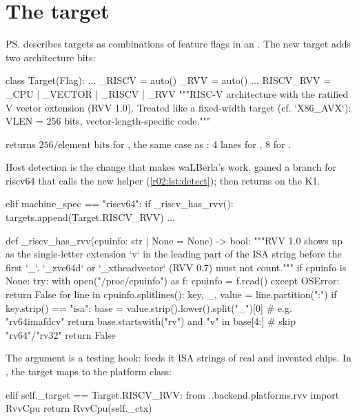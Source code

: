 \section{The target}\label{r02:sec:ps-target}

\ps{} describes targets as combinations of feature flags in an . The new
target adds two architecture bits:
\begin{pycode}
class Target(Flag):
    ...
    _RISCV = auto()
    _RVV = auto()
    ...
    RISCV_RVV = _CPU | _VECTOR | _RISCV | _RVV
    """RISC-V architecture with the ratified V vector extension (RVV 1.0). Treated like a
    fixed-width target (cf. `X86_AVX`): VLEN = 256 bits, vector-length-specific code."""
\end{pycode}
 returns $256/\text{element bits}$ for ,
the same case as : 4 lanes for , 8 for .

Host detection is the change that makes waLBerla's  work.
 gained a branch for riscv64 that calls the new helper
 (\cref{r02:lst:detect});  then returns
 on the K1.

\begin{pycode}[nolol=false,caption={[RVV host detection in pystencils]RVV host detection in \texttt{codegen/target.py} (abridged).},label=r02:lst:detect]
    elif machine_spec == "riscv64":
        if _riscv_has_rvv():
            targets.append(Target.RISCV_RVV)
    ...

def _riscv_has_rvv(cpuinfo: str | None = None) -> bool:
    """RVV 1.0 shows up as the single-letter extension `v` in the leading part of the
    ISA string before the first `_`. `_zve64d` or `_xtheadvector` (RVV 0.7) must not count."""
    if cpuinfo is None:
        try:
            with open("/proc/cpuinfo") as f:
                cpuinfo = f.read()
        except OSError:
            return False
    for line in cpuinfo.splitlines():
        key, _, value = line.partition(":")
        if key.strip() == "isa":
            base = value.strip().lower().split("_")[0]           # e.g. "rv64imafdcv"
            return base.startswith("rv") and "v" in base[4:]     # skip "rv64"/"rv32"
    return False
\end{pycode}
The  argument is a testing hook:  feeds it ISA
strings of real and invented chips. In ,
the target maps to the platform class:
\begin{pycode}
            elif self._target == Target.RISCV_RVV:
                from ..backend.platforms.rvv import RvvCpu
                return RvvCpu(self._ctx)
\end{pycode}

